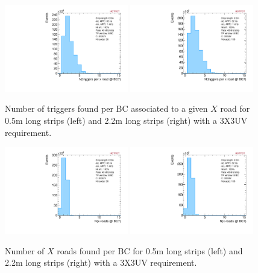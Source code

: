 \begin{figure}[!htpb]
  \begin{center}
    \includegraphics[width=0.48\textwidth]{figures/small_trigs_per_x.pdf}
    \includegraphics[width=0.48\textwidth]{figures/large_trigs_per_x.pdf}
  \end{center}
  \vspace{-10pt}
  \caption{Number of triggers found per BC associated to a given $X$ road for 0.5m long strips (left) and 2.2m long strips (right) with a 3X3UV requirement. }
  \label{fig:trig_per_x}
\end{figure}

\begin{figure}[!htpb]
  \begin{center}
    \includegraphics[width=0.48\textwidth]{figures/small_xroads.pdf}
    \includegraphics[width=0.48\textwidth]{figures/large_xroads.pdf}
  \end{center}
  \vspace{-10pt}
  \caption{Number of $X$ roads found per BC for 0.5m long strips (left) and 2.2m long strips (right) with a 3X3UV requirement. }
  \label{fig:xroads}
\end{figure}

